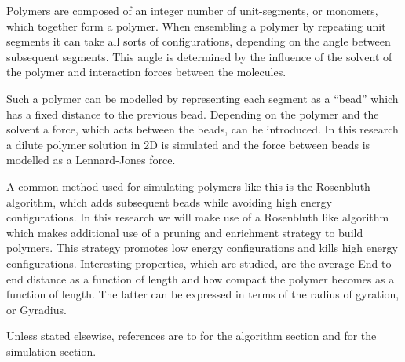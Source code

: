 Polymers are composed of an integer number of unit-segments, or monomers, which together form a polymer. When ensembling a polymer by repeating unit segments it can take all sorts of configurations, depending on the angle between subsequent segments. This angle is determined by the influence of the solvent of the polymer and interaction forces between the molecules. 

Such a polymer can be modelled by representing each segment as a ``bead'' which has a fixed distance to the previous bead. Depending on the polymer and the solvent a force, which acts between the beads, can be introduced. In this research a dilute polymer solution in 2D is simulated and the force between beads is modelled as a Lennard-Jones force.

A common method used for simulating polymers like this is the Rosenbluth algorithm, which adds subsequent beads while avoiding high energy configurations. In this research we will make use of a Rosenbluth like algorithm which makes additional use of a pruning and enrichment strategy to build polymers. This strategy promotes low energy configurations and kills high energy configurations. 
Interesting properties, which are studied, are the average End-to-end distance as a function of length and how compact the polymer becomes as a function of length. The latter can be expressed in terms of the radius of gyration, or Gyradius.

Unless stated elsewise, references are to \cite{baschnagel2004} for the algorithm section and \cite{thijssen2007} for the simulation section.